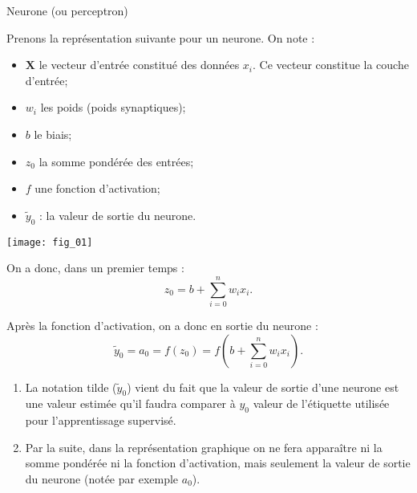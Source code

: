 \begin{defi}{Neurone (ou perceptron)}~\\


\begin{minipage}[c]{.55\linewidth}
Prenons la représentation suivante pour un neurone. On note :
\begin{itemize}
\item $\mathbf{X}$ le vecteur d'entrée constitué des données $x_i$. Ce vecteur constitue la couche d'entrée;
\item $w_i$ les poids (poids synaptiques);
\item $b$ le biais;
\item $z_0$ la somme pondérée des entrées;
\item $f$ une fonction d'activation; 
\item $\tilde{y}_0$ : la valeur de sortie du neurone.
\end{itemize}
\end{minipage}
\hfill
\begin{minipage}[c]{.4\linewidth}
\begin{center}
\texttt{[image: fig\_01]}
\end{center}
\end{minipage}

On a donc, dans un premier temps  :
$$z_0 = b+ \sum\limits_{i=0}^{n} w_i x_i. $$

Après la fonction d'activation, on a donc en sortie du neurone :
$$\tilde{y}_0 = a_0 = f(z_0)=f \left( b+ \sum\limits_{i=0}^{n} w_i x_i\right).$$

\begin{rem}
\begin{enumerate}
\item La notation tilde ($\tilde{y}_0$) vient du fait que la valeur de sortie d'une neurone est une valeur estimée qu'il faudra comparer à ${y}_0$ valeur de l'étiquette utilisée pour l'apprentissage supervisé.
\item Par la suite, dans la représentation graphique on ne fera apparaître ni la somme pondérée ni la fonction d'activation, mais seulement la valeur de sortie du neurone (notée par exemple $a_0$).
\end{enumerate}
\end{rem}

\end{defi}





